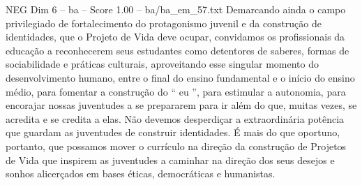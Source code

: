 \begin{textsample}{NEG Dim 6 – ba – Score 1.00 – ba/ba\_em\_57.txt}
Demarcando ainda o campo privilegiado de fortalecimento do protagonismo juvenil e da construção de identidades, que o Projeto de Vida deve ocupar, convidamos os profissionais da educação a reconhecerem seus estudantes como detentores de saberes, formas de sociabilidade e práticas culturais, aproveitando esse singular momento do desenvolvimento humano, entre o final do ensino fundamental e o início do ensino médio, para fomentar a construção do “ eu ”, para estimular a autonomia, para encorajar nossas juventudes a se prepararem para ir além do que, muitas vezes, se acredita e se credita a elas.
Não devemos desperdiçar a extraordinária potência que guardam as juventudes de construir identidades.
É mais do que oportuno, portanto, que possamos mover o currículo na direção da construção de Projetos de Vida que inspirem as juventudes a caminhar na direção dos seus desejos e sonhos alicerçados em bases éticas, democráticas e humanistas.

\end{textsample}
